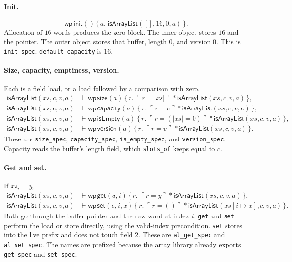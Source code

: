 \documentclass[11pt]{article}
\newcommand{\Unit}{\mathsf{()}}
\newcommand{\sep}{\mathbin{*}}
\newcommand{\Wpre}{\mathsf{wp}}
\newcommand{\pure}[1]{\ulcorner #1 \urcorner}
\begin{document}
\paragraph{Init.}
\[
\Wpre\,\mathsf{init}()
\,\{\,a.\; \mathsf{isArrayList}([], 16, 0, a)\,\}.
\]
Allocation of \(16\) words produces the zero block.
The inner object stores \(16\) and the pointer.
The outer object stores that buffer, length \(0\), and version \(0\).
This is \texttt{init\_spec}.
\texttt{default\_capacity} is \(16\).

\paragraph{Size, capacity, emptiness, version.}
Each is a field load, or a load followed by a comparison with zero.
\[
\begin{aligned}
\mathsf{isArrayList}(xs, c, v, a)
&\vdash
\Wpre\,\mathsf{size}(a)
\,\{\,r.\; \pure{r = \lvert xs \rvert} \sep \mathsf{isArrayList}(xs, c, v, a)\,\},\\
\mathsf{isArrayList}(xs, c, v, a)
&\vdash
\Wpre\,\mathsf{capacity}(a)
\,\{\,r.\; \pure{r = c} \sep \mathsf{isArrayList}(xs, c, v, a)\,\},\\
\mathsf{isArrayList}(xs, c, v, a)
&\vdash
\Wpre\,\mathsf{isEmpty}(a)
\,\{\,r.\; \pure{r = (\lvert xs \rvert = 0)} \sep \mathsf{isArrayList}(xs, c, v, a)\,\},\\
\mathsf{isArrayList}(xs, c, v, a)
&\vdash
\Wpre\,\mathsf{version}(a)
\,\{\,r.\; \pure{r = v} \sep \mathsf{isArrayList}(xs, c, v, a)\,\}.
\end{aligned}
\]
These are \texttt{size\_spec}, \texttt{capacity\_spec}, \texttt{is\_empty\_spec}, and \texttt{version\_spec}.
Capacity reads the buffer's length field, which \texttt{slots\_of} keeps equal to \(c\).

\paragraph{Get and set.}
If \(xs_i = y\),
\[
\begin{aligned}
\mathsf{isArrayList}(xs, c, v, a)
&\vdash
\Wpre\,\mathsf{get}(a, i)
\,\{\,r.\; \pure{r = y} \sep \mathsf{isArrayList}(xs, c, v, a)\,\},\\
\mathsf{isArrayList}(xs, c, v, a)
&\vdash
\Wpre\,\mathsf{set}(a, i, x)
\,\{\,r.\; \pure{r = \Unit} \sep \mathsf{isArrayList}(xs[i \mapsto x], c, v, a)\,\}.
\end{aligned}
\]
Both go through the buffer pointer and the raw word at index \(i\).
\texttt{get} and \texttt{set} perform the load or store directly, using the valid-index precondition.
\texttt{set} stores into the live prefix and does not touch field \(2\).
These are \texttt{al\_get\_spec} and \texttt{al\_set\_spec}.
The names are prefixed because the array library already exports \texttt{get\_spec} and \texttt{set\_spec}.
\end{document}
